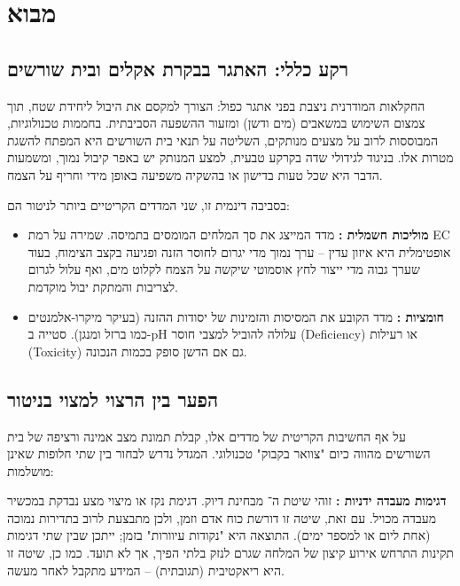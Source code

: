\section{מבוא}

\subsection{רקע כללי: האתגר בבקרת אקלים ובית שורשים}
החקלאות המודרנית ניצבת בפני אתגר כפול: הצורך למקסם את היבול ליחידת שטח, תוך צמצום השימוש במשאבים (מים ודשן) ומזעור ההשפעה הסביבתית. בחממות טכנולוגיות, המבוססות לרוב על מצעים מנותקים, השליטה על תנאי בית השורשים  היא המפתח להשגת מטרות אלו. בניגוד לגידולי שדה בקרקע טבעית, למצע המנותק יש באפר קיבול  נמוך, ומשמעות הדבר היא שכל טעות בדישון או בהשקיה משפיעה באופן מידי וחריף על הצמח.

בסביבה דינמית זו, שני המדדים הקריטיים ביותר לניטור הם:

\begin{itemize}
    \item \textbf{מוליכות חשמלית :} מדד המייצג את סך המלחים המומסים בתמיסה. שמירה על רמת EC אופטימלית היא איזון עדין -- ערך נמוך מדי יגרום לחוסר הזנה ופגיעה בקצב הצימוח, בעוד שערך גבוה מדי ייצור לחץ אוסמוטי שיקשה על הצמח לקלוט מים, ואף עלול לגרום לצריבות והמתקת יבול מוקדמת.
    \item \textbf{חומציות :} מדד הקובע את המסיסות והזמינות של יסודות ההזנה (בעיקר מיקרו-אלמנטים כמו ברזל ומנגן). סטייה ב-pH עלולה להוביל למצבי חוסר (Deficiency) או רעילות (Toxicity) גם אם הדשן סופק בכמות הנכונה.
\end{itemize}

\subsection{הפער בין הרצוי למצוי בניטור}
על אף החשיבות הקריטית של מדדים אלו, קבלת תמונת מצב אמינה ורציפה של בית השורשים מהווה כיום "צוואר בקבוק" טכנולוגי. המגדל נדרש לבחור בין שתי חלופות שאינן מושלמות:

\textbf{דגימות מעבדה ידניות :} זוהי שיטת ה־ מבחינת דיוק. דגימת נקז או מיצוי מצע נבדקת במכשיר מעבדה מכויל. עם זאת, שיטה זו דורשת כוח אדם וזמן, ולכן מתבצעת לרוב בתדירות נמוכה (אחת ליום או למספר ימים). התוצאה היא "נקודות עיוורות" בזמן; ייתכן שבין שתי דגימות תקינות התרחש אירוע קיצון של המלחה  שגרם לנזק בלתי הפיך, אך לא תועד. כמו כן, שיטה זו היא ריאקטיבית (תגובתית) -- המידע מתקבל לאחר מעשה.

